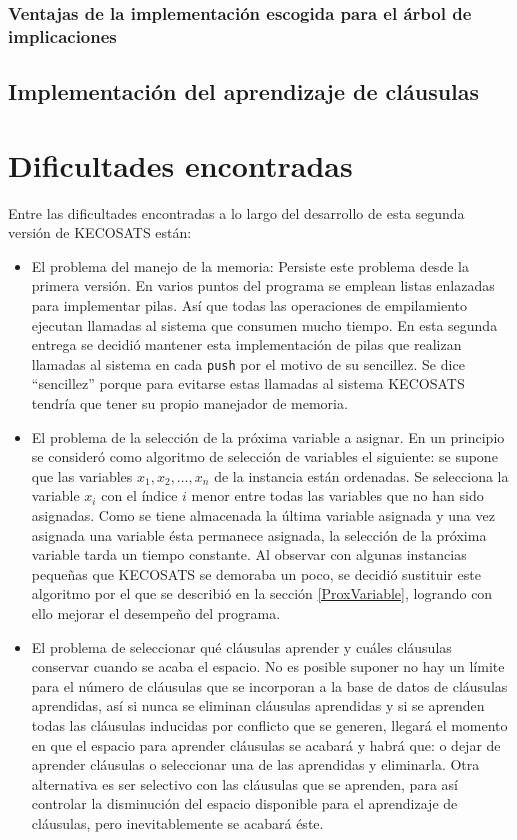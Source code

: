 \documentclass[12pt,lettersize,oneside]{article}
\begin{document}
\subsubsection{Ventajas de la implementación escogida para el árbol de implicaciones}


\subsection{Implementación del aprendizaje de cláusulas}
\newpage

\section{Dificultades encontradas}
Entre las dificultades encontradas a lo largo del desarrollo de esta segunda
versión de KECOSATS están:
\begin{itemize}
\item El problema del manejo de la memoria: Persiste este problema desde la
  primera versión. En varios puntos del programa se emplean listas enlazadas
  para implementar pilas. Así que todas las operaciones de empilamiento ejecutan
  llamadas al sistema que consumen mucho tiempo. En esta segunda entrega se
  decidió mantener esta implementación de pilas que realizan llamadas al sistema
  en cada {\tt push} por el motivo de su sencillez. Se dice ``sencillez'' porque
  para evitarse estas llamadas al sistema KECOSATS tendría que tener su propio
  manejador de memoria.
\item El problema de la selección de la próxima variable a asignar. En un
  principio se consideró como algoritmo de selección de variables el siguiente:
  se supone que las variables $x_1,x_2,\ldots,x_n$ de la instancia están
  ordenadas. Se selecciona la variable $x_i$ con el índice $i$ menor entre todas
  las variables que no han sido asignadas. Como se tiene almacenada la última
  variable asignada y una vez asignada una variable ésta permanece asignada, la
  selección de la próxima variable tarda un tiempo constante. Al observar con
  algunas instancias pequeñas que KECOSATS se demoraba un poco, se decidió
  sustituir este algoritmo por el que se describió en la sección
  \ref{ProxVariable}, logrando con ello mejorar el desempeño del programa.
\item El problema de seleccionar qué cláusulas aprender y cuáles cláusulas
  conservar cuando se acaba el espacio. No es posible suponer no hay un límite
  para el número de cláusulas que se incorporan a la base de datos de cláusulas
  aprendidas, así si nunca se eliminan cláusulas aprendidas y si se aprenden
  todas las cláusulas inducidas por conflicto que se generen, llegará el momento
  en que el espacio para aprender cláusulas se acabará y habrá que: o dejar de
  aprender cláusulas o seleccionar una de las aprendidas y eliminarla. Otra
  alternativa es ser selectivo con las cláusulas que se aprenden, para así
  controlar la disminución del espacio disponible para el aprendizaje de
  cláusulas, pero inevitablemente se acabará éste.
\end{itemize}
\end{document}
